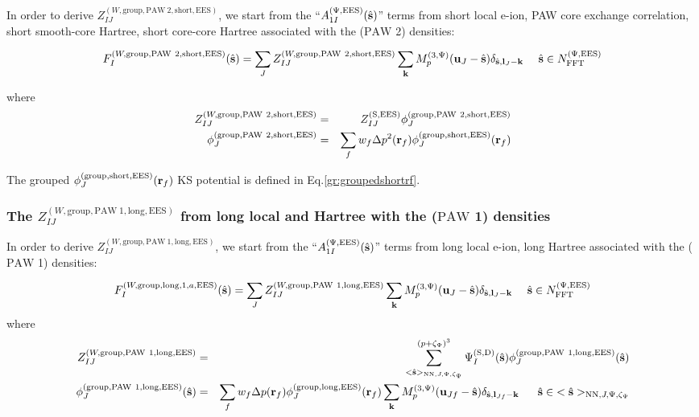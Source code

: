 \documentclass[paper=a4, fontsize=11pt]{article} %
\numberwithin{equation}{section} %
\numberwithin{figure}{section} %
\numberwithin{table}{section} %
\newcommand{\bu}{{\bf{u}}}
\newcommand{\bl}{{\bf{l}}}
\newcommand{\bk}{{\bf{k}}}
\newcommand{\bs}{{\bf{s}}}
\newcommand{\br}{{\bf{r}}}
\newcommand{\hs}{{\hat{\bf{s}}}}
\newcommand{\rS}{{\mathrm{S}}}
\newcommand{\rEES}{{\mathrm{EES}}}
\newcommand{\rgr}{{\mathrm{group}}}
\newcommand{\rNN}{{\mathrm{NN}}}
\newcommand{\rshort}{{\mathrm{short}}}
\newcommand{\rlong}{{\mathrm{long}}}
\newcommand{\rP}{{\mathrm{PAW}}}
\newcommand{\rD}{{\mathrm{D}}}
\newcommand{\NFFTpEES}{{N^{\mathrm{(\Psi,\rEES})}_{\mathrm{FFT}}}}
\newcommand{\Mp}{{M_p^{(3,\Psi)}}}
\newcommand{\pzp}{{(p+\zeta_{\Psi})^3}}
\newcommand{\hsJp}{{<\hs>_{\rNN,J,\Psi,\zeta_\Psi}}}
\newcommand{\hsinJp}{{\ \ \ \ \ \hs  \in  \hsJp}}
\newcommand{\hsinpEES}{{\ \ \ \ \hs \in \NFFTpEES}}
\begin{document}
In order to derive $Z_{IJ}^{(W,\rgr,\rP\ 2,\rshort,\rEES)}$, we start from the ``$A_{1I}^{(\Psi,\rEES)}(\hs) $'' terms from short local e-ion, PAW core exchange correlation, short smooth-core Hartree, short core-core Hartree associated with the ($\rP$ 2) densities:

\begin{equation}\label{gr:FIJshort2}
F_I^{(W,\rgr,\rP\ 2,\rshort,\rEES)}(\hs) = \sum_J Z_{IJ}^{(W,\rgr,\rP\ 2,\rshort,\rEES)} \sum_{\bk} \Mp(\bu_{J}-\hat \bs)\delta_{\hat \bs,\bl_{J}-\bk} \hsinpEES \\
\end{equation}

where
\begin{eqnarray}
\label{FIJ:short2}
Z_{IJ}^{(W,\rgr,\rP\ 2,\rshort,\rEES)}&=&Z_{IJ}^{(\rS,\rEES)}\phi_J^{(\rgr,\rP\ 2,\rshort,\rEES)} \\
\label{gr:phishort2}
\phi_J^{(\rgr,\rP\ 2,\rshort,\rEES)} &=& \sum_f w_f \Delta p^2(\br_f) \phi_J^{(\rgr,\rshort,\rEES)}(\br_f)  
\end{eqnarray}

The grouped $\phi_J^{(\rgr,\rshort,\rEES)}(\br_f)$ KS potential is defined in Eq.\eqref{gr:groupedshortrf}. \\

\subsubsection{The $Z_{IJ}^{(W,\rgr,\rP\ 1,\rlong,\rEES)}$ from long local and Hartree with the ($\rP$ 1) densities}

In order to derive $Z_{IJ}^{(W,\rgr,\rP\ 1,\rlong,\rEES)}$, we start from the ``$A_{1I}^{(\Psi,\rEES)}(\hs) $'' terms from long local e-ion, long Hartree associated with the ($\rP$ 1) densities:

\begin{equation}
F_I^{(W,\rgr,\rlong,1,a,\rEES)}(\hat \bs) = \sum_J Z_{IJ}^{(W,\rgr,\rP\ 1,\rlong,\rEES)}\sum_{\bk} \Mp(\bu_{J}-\hat \bs) \delta_{\hat \bs,\bl_J-\bk} \hsinpEES\\
\end{equation}
where
\begin{eqnarray}
\label{FIJ:long1}
Z_{IJ}^{(W,\rgr,\rP\ 1,\rlong,\rEES)} &=& \sum_{\hsJp}^{\pzp} \Psi_{I}^{(\rS,\rD)}(\hat {\bs}) \phi_J^{(\rgr,\rP\ 1,\rlong,\rEES)}(\hs) \\
\label{gr:philong1}
\phi_J^{(\rgr,\rP\ 1,\rlong,\rEES)}(\hs) &=& \sum_f w_f \Delta p(\br_f) \phi_J^{(\rgr,\rlong,\rEES)}(\br_f)  \sum_{\bk} \Mp(\bu_{Jf}-\hat \bs) \delta_{\hat \bs,\bl_{Jf}-\bk} \hsinJp\nonumber\\
&\ &
\end{eqnarray}
\end{document}
